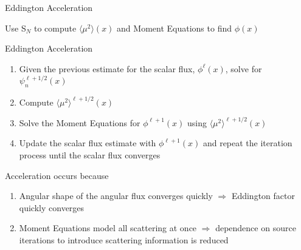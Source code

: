 \documentclass[10pt]{beamer}
\newcommand{\SN}{S$_N$\xspace}
\newcommand{\edd}{\langle \mu^2 \rangle}
\begin{document}
\begin{frame}{Eddington Acceleration}

    Use \SN to compute $\edd(x)$ and Moment Equations to find $\phi(x)$ 

    \begin{exampleblock}{Eddington Acceleration}
    \begin{enumerate}
        \item Given the previous estimate for the scalar flux, $\phi^{\ell}(x)$, solve for $\psi_n^{\ell+1/2}(x)$

        \item \alert{Compute $\edd^{\ell+1/2}(x)$ }

        \item \alert{Solve the Moment Equations for $\phi^{\ell+1}(x)$ 
        	using $\edd^{\ell+1/2}(x)$} 

        \item Update the scalar flux estimate with $\phi^{\ell+1}(x)$ and repeat the iteration process until the scalar flux converges
    \end{enumerate}
    \end{exampleblock}

    Acceleration occurs because
    \begin{enumerate}
    	\item Angular shape of the angular flux converges quickly $\Rightarrow$ Eddington factor quickly converges 

    	\item Moment Equations model all scattering at once $\Rightarrow$ dependence on source iterations to introduce scattering information is reduced 

    \end{enumerate}

\end{frame}
\end{document}
